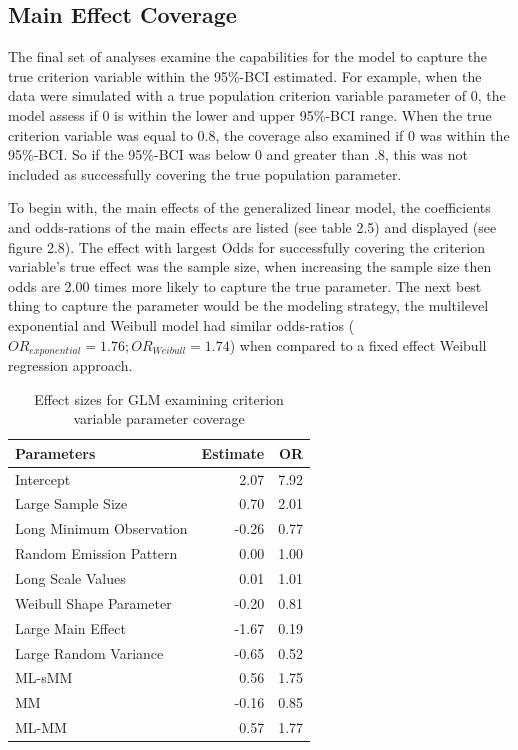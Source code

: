 \documentclass[12pt]{./styles/outhesis}
\begin{document}
\subsection{Main Effect Coverage}\label{main-effect-coverage}
The final set of analyses examine the capabilities for the model to
capture the true criterion variable within the 95\%-BCI estimated. For
example, when the data were simulated with a true population criterion
variable parameter of 0, the model assess if 0 is within the lower and
upper 95\%-BCI range. When the true criterion variable was equal to 0.8,
the coverage also examined if 0 was within the 95\%-BCI. So if the
95\%-BCI was below 0 and greater than .8, this was not included as
successfully covering the true population parameter.

To begin with, the main effects of the generalized linear model, the
coefficients and odds-rations of the main effects are listed (see table
2.5) and displayed (see figure 2.8). The effect with largest Odds for
successfully covering the criterion variable's true effect was the
sample size, when increasing the sample size then odds are 2.00 times
more likely to capture the true parameter. The next best thing to
capture the parameter would be the modeling strategy, the multilevel
exponential and Weibull model had similar odds-ratios
(\(OR_{exponential}=1.76; OR_{Weibull}=1.74\)) when compared to a fixed
effect Weibull regression approach.

\begin{table}
\centering
\caption{\label{tab:print-GLM-table}Effect sizes for GLM examining criterion variable parameter coverage}
\centering
\begin{tabular}[t]{l|r|r}
\hline
Parameters & Estimate & OR\\
\hline
Intercept & 2.07 & 7.92\\
\hline
Large Sample Size & 0.70 & 2.01\\
\hline
Long Minimum Observation & -0.26 & 0.77\\
\hline
Random Emission Pattern & 0.00 & 1.00\\
\hline
Long Scale Values & 0.01 & 1.01\\
\hline
Weibull Shape Parameter & -0.20 & 0.81\\
\hline
Large Main Effect & -1.67 & 0.19\\
\hline
Large Random Variance & -0.65 & 0.52\\
\hline
ML-sMM & 0.56 & 1.75\\
\hline
MM & -0.16 & 0.85\\
\hline
ML-MM & 0.57 & 1.77\\
\hline
\end{tabular}
\end{table}
\end{document}
